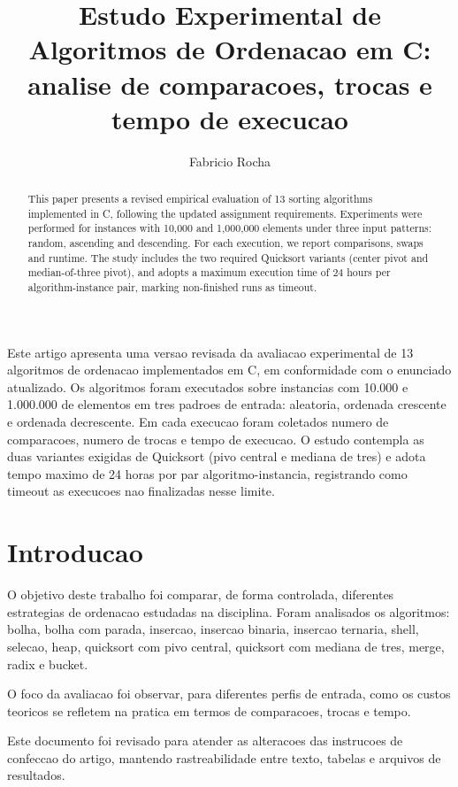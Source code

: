 \documentclass[12pt]{article}
\title{Estudo Experimental de Algoritmos de Ordenacao em C: analise de comparacoes, trocas e tempo de execucao}
\author{Fabricio Rocha\inst{1}}
\begin{document}
\maketitle

\begin{abstract}
This paper presents a revised empirical evaluation of 13 sorting algorithms implemented
in C, following the updated assignment requirements. Experiments were performed for
instances with 10,000 and 1,000,000 elements under three input patterns: random,
ascending and descending. For each execution, we report comparisons, swaps and runtime.
The study includes the two required Quicksort variants (center pivot and median-of-three
pivot), and adopts a maximum execution time of 24 hours per algorithm-instance pair,
marking non-finished runs as timeout.
\end{abstract}

\begin{resumo}
Este artigo apresenta uma versao revisada da avaliacao experimental de 13 algoritmos de
ordenacao implementados em C, em conformidade com o enunciado atualizado. Os
algoritmos foram executados sobre instancias com 10.000 e 1.000.000 de elementos em
tres padroes de entrada: aleatoria, ordenada crescente e ordenada decrescente. Em cada
execucao foram coletados numero de comparacoes, numero de trocas e tempo de execucao.
O estudo contempla as duas variantes exigidas de Quicksort (pivo central e mediana de
tres) e adota tempo maximo de 24 horas por par algoritmo-instancia, registrando como
timeout as execucoes nao finalizadas nesse limite.
\end{resumo}

\section{Introducao}
O objetivo deste trabalho foi comparar, de forma controlada, diferentes estrategias de
ordenacao estudadas na disciplina. Foram analisados os algoritmos: bolha,
bolha com parada, insercao, insercao binaria, insercao ternaria, shell,
selecao, heap, quicksort com pivo central, quicksort com mediana de tres,
merge, radix e bucket.

O foco da avaliacao foi observar, para diferentes perfis de entrada, como os custos
teoricos se refletem na pratica em termos de comparacoes, trocas e tempo.

Este documento foi revisado para atender as alteracoes das instrucoes de confeccao do
artigo, mantendo rastreabilidade entre texto, tabelas e arquivos de resultados.
\end{document}
